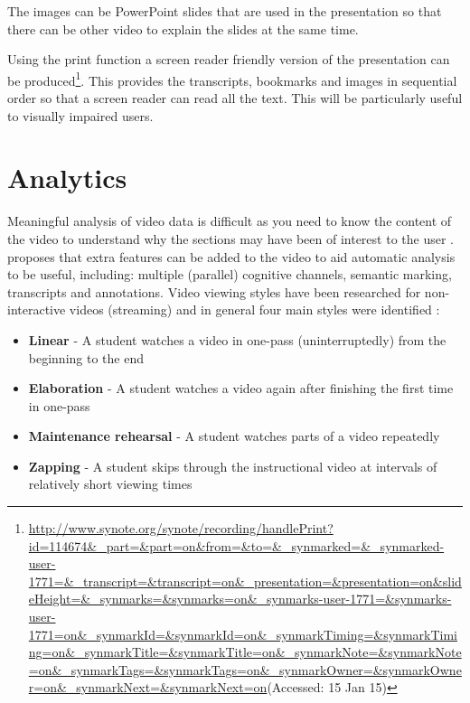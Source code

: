 The images can be PowerPoint slides that are used in the presentation so that there can be other video to explain the slides at the same time.

Using the print function a screen reader friendly version of the presentation can be produced\footnote{\url{http://www.synote.org/synote/recording/handlePrint?id=114674&_part=&part=on&from=&to=&_synmarked=&_synmarked-user-1771=&_transcript=&transcript=on&_presentation=&presentation=on&slideHeight=&_synmarks=&synmarks=on&_synmarks-user-1771=&synmarks-user-1771=on&_synmarkId=&synmarkId=on&_synmarkTiming=&synmarkTiming=on&_synmarkTitle=&synmarkTitle=on&_synmarkNote=&synmarkNote=on&_synmarkTags=&synmarkTags=on&_synmarkOwner=&synmarkOwner=on&_synmarkNext=&synmarkNext=on}(Accessed: 15 Jan 15)}. This provides the transcripts, bookmarks and images in sequential order so that a screen reader can read all the text. This will be particularly useful to visually impaired users.

\section{Analytics}
\label{Section:Analytics}
Meaningful analysis of video data is difficult as you need to know the content of the video to understand why the sections may have been of interest to the user \citep{videoLectures}.  \citep{videoLectures} proposes that extra features can be added to the video to aid automatic analysis to be useful, including: multiple (parallel) cognitive channels, semantic marking, transcripts and annotations. Video viewing styles have been researched for non-interactive videos (streaming) and in general four main styles were identified \citep{DeBoer}:
\begin{itemize}
\item \textbf{Linear} - A student watches a video in one-pass (uninterruptedly) from the beginning to the end
\item \textbf{Elaboration} - A student watches a video again after finishing the first time in one-pass
\item \textbf{Maintenance rehearsal} - A student watches parts of a video repeatedly
\item \textbf{Zapping} - A student skips through the instructional video at intervals of relatively short viewing times
\end{itemize}

